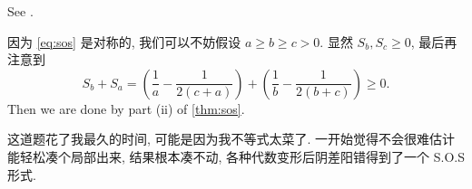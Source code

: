 \begin{soln}
\begin{subproof}
See \cite{sosmethod}.
\end{subproof}

因为 \cref{eq:sos} 是对称的, 我们可以不妨假设 $a \ge b \ge c > 0$.
显然 $S_b, S_c \ge 0$, 最后再注意到
\[
S_b + S_a = \left(\frac{1}{a} - \frac{1}{2(c+a)}\right) +
\left(\frac{1}{b} - \frac{1}{2(b+c)}\right) \ge 0.
\]
Then we are done by part (ii) of \cref{thm:sos}.
\end{soln}

\begin{rem*}
这道题花了我最久的时间, 可能是因为我不等式太菜了.
一开始觉得不会很难估计能轻松凑个局部出来, 结果根本凑不动,
各种代数变形后阴差阳错得到了一个 S.O.S 形式.
\end{rem*}
